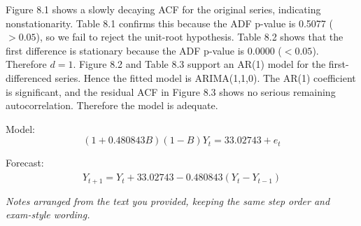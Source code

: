 \documentclass[11pt]{article}
\begin{document}
Figure 8.1 shows a slowly decaying ACF for the original series, indicating nonstationarity. Table 8.1 confirms this because the ADF p-value is 0.5077 ($>0.05$), so we fail to reject the unit-root hypothesis. Table 8.2 shows that the first difference is stationary because the ADF p-value is 0.0000 ($<0.05$). Therefore $d=1$. Figure 8.2 and Table 8.3 support an AR(1) model for the first-differenced series. Hence the fitted model is ARIMA(1,1,0). The AR(1) coefficient is significant, and the residual ACF in Figure 8.3 shows no serious remaining autocorrelation. Therefore the model is adequate.

Model:
\[
\boxed{(1+0.480843B)(1-B)Y_t = 33.02743 + e_t}
\]

Forecast:
\[
\boxed{\hat{Y}_{t+1}=Y_t+33.02743-0.480843(Y_t-Y_{t-1})}
\]

\vfill
\noindent\textit{Notes arranged from the text you provided, keeping the same step order and exam-style wording.}
\end{document}
